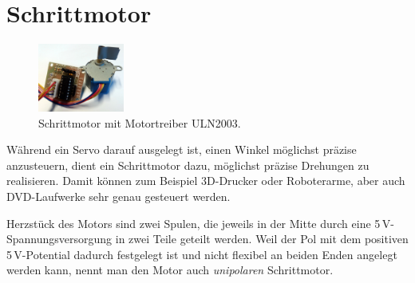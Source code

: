 \newpage
\section{Schrittmotor}\label{sec:schrittmotor}


\begin{figure}
	\centering
	\vspace{-0.5\baselineskip}
	\includegraphics[width=0.252\textwidth]{./pics/schrittmotor.jpg}
	\caption{Schrittmotor mit Motortreiber ULN2003.}
\end{figure}
Während ein Servo darauf ausgelegt ist, einen Winkel möglichst präzise anzusteuern, dient ein Schrittmotor dazu, möglichst präzise Drehungen zu realisieren. Damit können zum Beispiel 3D-Drucker oder Roboterarme, aber auch DVD-Laufwerke sehr genau gesteuert werden.

Herzstück des Motors sind zwei Spulen, die jeweils in der Mitte durch eine 5\,V-Spannungsversorgung in zwei Teile geteilt werden. Weil der Pol mit dem positiven 5\,V-Potential dadurch festgelegt ist und nicht flexibel an beiden Enden angelegt werden kann, nennt man den Motor auch \emph{unipolaren} Schrittmotor.

